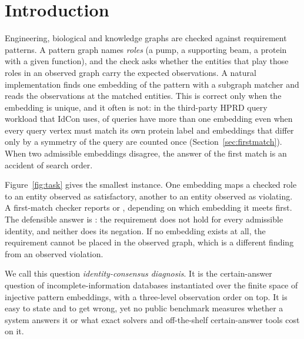 \section{Introduction}
Engineering, biological and knowledge graphs are checked against requirement patterns. A pattern graph names \emph{roles} (a pump, a supporting beam, a protein with a given function), and the check asks whether the entities that play those roles in an observed graph carry the expected observations. A natural implementation finds one embedding of the pattern with a subgraph matcher and reads the observations at the matched entities. This is correct only when the embedding is unique, and it often is not: in the third-party HPRD query workload that IdCon uses, \hprdAutoOrbitMulti{} of \hprdCountFullQueries{} queries have more than one embedding even when every query vertex must match its own protein label and embeddings that differ only by a symmetry of the query are counted once (Section~\ref{sec:firstmatch}). When two admissible embeddings disagree, the answer of the first match is an accident of search order.

Figure~\ref{fig:task} gives the smallest instance. One embedding maps a checked role to an entity observed as satisfactory, another to an entity observed as violating. A first-match checker reports \Sat{} or \Vio{}, depending on which embedding it meets first. The defensible answer is \Unk{}: the requirement does not hold for every admissible identity, and neither does its negation. If no embedding exists at all, the requirement cannot be placed in the observed graph, which is a different finding from an observed violation.

We call this question \emph{identity-consensus diagnosis}. It is the certain-answer question of incomplete-information databases \cite{imielinski,libkin2014} instantiated over the finite space of injective pattern embeddings, with a three-level observation order on top. It is easy to state and to get wrong, yet no public benchmark measures whether a system answers it or what exact solvers and off-the-shelf certain-answer tools cost on it.

